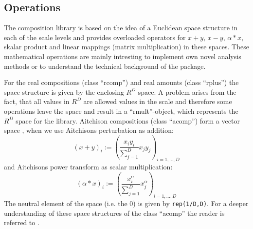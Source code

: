 \documentclass{article}
\newcommand{\code}[1]{{\tt #1}}
\begin{document}
\subsection{Operations}\label{ops}
The composition library is based on the idea of a Euclidean space structure in
each of the scale levels and provides overloaded operators for \(x+y\),
\(x-y\), \(\alpha*x\), skalar product and linear mappings (matrix
multiplication) in these spaces. These mathematical operations are mainly
intresting to implement own novel analysis methods or to understand the
technical background of the package.
\par 
For the real compositions (class ``rcomp'') and real amounts (class ``rplus'')
the space structure is given by the enclosing \(R^D\) space. A problem arises
from the fact, that all values in \(R^D\) are allowed values in the scale and
therefore some operations leave the space and result in a ``rmult''-object,
which represents the \(R^D\) space for the library.  Aitchison compositions
(class ``acomp'') form a vector space\cite{Ait86} \cite{BM+01}, when we use
Aitchisons perturbation as addition:
\[
(x+y)_i := \left(\frac{x_iy_i}{\sum_{j=1}^{D}}x_jy_j\right)_{i=1,\ldots,D}
\]
and Aitchisons power transform as scalar multiplication:
\[
(\alpha*x)_i := \left(\frac{x_i^\alpha}{\sum_{j=1}^{D}}x_j^{\alpha}\right)_{i=1,\ldots,D}
\]
The neutral element of the space (i.e. the 0) is given by \code{rep(1/D,D)}.
For a deeper understanding of these space structures of the class ``acomp''
the reader is referred to \cite{BM+01}. \par
 
\end{document}
